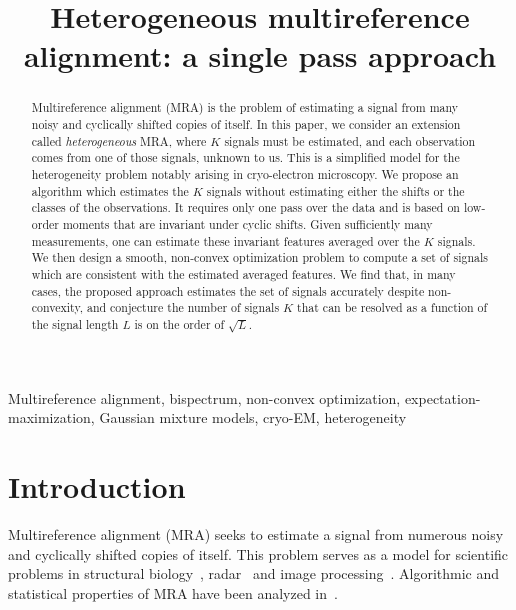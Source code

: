 \documentclass[english]{article}
\title{Heterogeneous multireference alignment: a single pass approach}
\numberwithin{equation}{section}
\numberwithin{figure}{section}
\theoremstyle{plain}
\theoremstyle{definition}
\theoremstyle{remark}
\theoremstyle{plain}
\theoremstyle{remark}
\theoremstyle{plain}
\theoremstyle{plain}
\begin{document}
\ninept
%
\maketitle
%
%
\begin{abstract}
Multireference alignment (MRA) is the problem of estimating a signal from many noisy and cyclically shifted copies of itself. In this paper, we consider an extension called \emph{heterogeneous} MRA, where $K$ signals must be estimated, and each observation comes from one of those signals, unknown to us. This is a simplified model for the heterogeneity problem notably arising in cryo-electron microscopy. We propose an algorithm which estimates the $K$ signals without estimating either the shifts or the classes of the observations. It requires only one pass over the data and is based on low-order moments that are invariant under cyclic shifts. Given sufficiently many measurements, one can estimate these invariant features averaged over the $K$ signals. We then design a smooth, non-convex optimization problem to compute a set of signals which are consistent with the estimated averaged features. We find that, in many cases, the proposed approach estimates the set of signals accurately despite non-convexity, and conjecture the number of signals $K$ that can be resolved as a function of the signal length $L$ is on the order of $\sqrt{L}$.
\end{abstract}

\begin{keywords}
Multireference alignment, bispectrum, non-convex optimization, expectation-maximization, Gaussian mixture models, cryo-EM, heterogeneity
\end{keywords}










\section{Introduction}

Multireference alignment (MRA) seeks to estimate a signal from numerous noisy and cyclically shifted copies of itself. This problem serves as a model for scientific problems in structural biology~\cite{diamond1992multiple,theobald2012optimal,park2011stochastic,park2014assembly}, radar~\cite{zwart2003fast,gil2005using} and image processing~\cite{dryden1998statistical,foroosh2002extension,robinson2009optimal}. Algorithmic and statistical properties of MRA have been analyzed in~\cite{bendory2017bispectrum,bandeira2017optimal,perry2017sample,bandeira2014multireference,abbe2017sample}.
\end{document}
